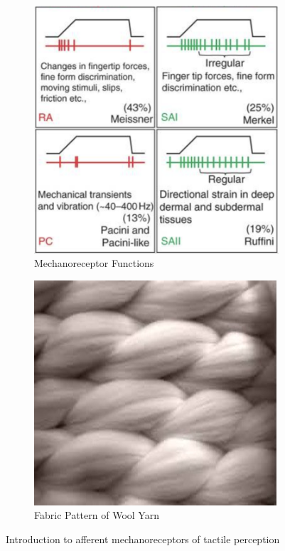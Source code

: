 \documentclass[
11pt,notheorems,hyperref={pdfauthor=whatever}
]{beamer}
\begin{document}
\begin{frame}
\begin{figure}
\begin{subfigure}[b]{0.3\textwidth}
            \includegraphics[scale=0.3]{Neuro_RecepFunc.jpg}
            \caption{Mechanoreceptor Functions \cite{delhaye2018neural}}
        \end{subfigure}
        \begin{subfigure}[b]{0.3\textwidth}
            \centering
            \includegraphics[scale=0.37]{Neuro_Fabric.jpg}
            \caption{Fabric Pattern of Wool Yarn}
        \end{subfigure}
        \renewcommand{\figurename}{Figure 10}
        \caption{Introduction to afferent mechanoreceptors of tactile perception}
    \end{figure}
\end{frame}
\end{document}
